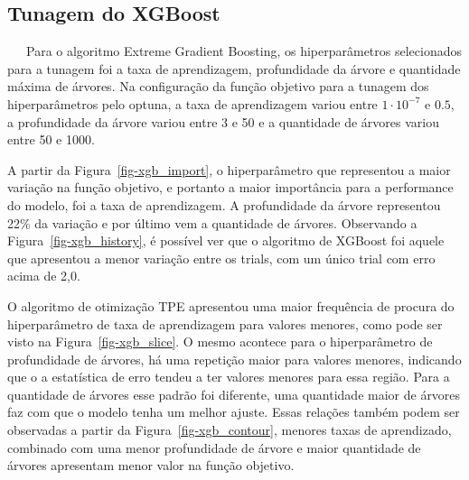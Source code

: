 \documentclass[
  12pt,
  a4paper,
]{scrreprt}
\begin{document}
\subsection{Tunagem do XGBoost}\label{tunagem-do-xgboost}

~~~Para o algoritmo Extreme Gradient Boosting, os hiperparâmetros
selecionados para a tunagem foi a taxa de aprendizagem, profundidade da
árvore e quantidade máxima de árvores. Na configuração da função
objetivo para a tunagem dos hiperparâmetros pelo optuna, a taxa de
aprendizagem variou entre \(1 \cdot 10^{-7}\) e \(0.5\), a profundidade
da árvore variou entre 3 e 50 e a quantidade de árvores variou entre 50
e 1000.

\vspace{12pt}

A partir da Figura~\ref{fig-xgb_import}, o hiperparâmetro que
representou a maior variação na função objetivo, e portanto a maior
importância para a performance do modelo, foi a taxa de aprendizagem. A
profundidade da árvore representou 22\% da variação e por último vem a
quantidade de árvores. Observando a Figura~\ref{fig-xgb_history}, é
possível ver que o algoritmo de XGBoost foi aquele que apresentou a
menor variação entre os trials, com um único trial com erro acima de
2,0.

\vspace{12pt}

O algoritmo de otimização TPE apresentou uma maior frequência de procura
do hiperparâmetro de taxa de aprendizagem para valores menores, como
pode ser visto na Figura~\ref{fig-xgb_slice}. O mesmo acontece para o
hiperparâmetro de profundidade de árvores, há uma repetição maior para
valores menores, indicando que o a estatística de erro tendeu a ter
valores menores para essa região. Para a quantidade de árvores esse
padrão foi diferente, uma quantidade maior de árvores faz com que o
modelo tenha um melhor ajuste. Essas relações também podem ser
observadas a partir da Figura~\ref{fig-xgb_contour}, menores taxas de
aprendizado, combinado com uma menor profundidade de árvore e maior
quantidade de árvores apresentam menor valor na função objetivo.
\end{document}
